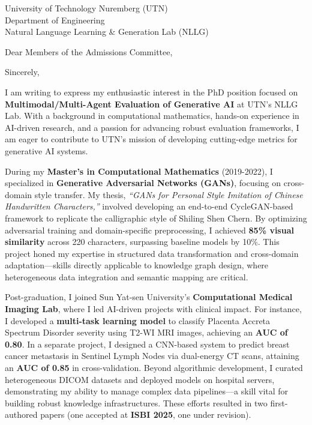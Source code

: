 \documentclass[11pt,a4paper, final]{moderncv}
\begin{document}
{University of Technology Nuremberg (UTN)\\
Department of Engineering\\
Natural Language Learning \& Generation Lab (NLLG)
}
\date{\today}
\opening{Dear Members of the Admissions Committee,}
\closing{Sincerely,}
\makelettertitle
\thispagestyle{empty}
\pagestyle{empty}
I am writing to express my enthusiastic interest in the PhD position focused on 
\textbf{Multimodal/Multi-Agent Evaluation of Generative AI} at UTN's NLLG Lab. 
With a background in computational mathematics, hands-on experience in AI-driven research, 
and a passion for advancing robust evaluation frameworks, 
I am eager to contribute to UTN's mission of developing cutting-edge metrics for generative AI systems.

During my \textbf{Master's in Computational Mathematics} (2019-2022), 
I specialized in \textbf{Generative Adversarial Networks (GANs)}, 
focusing on cross-domain style transfer. 
My thesis, \emph{``GANs for Personal Style Imitation of Chinese Handwritten Characters,''} 
involved developing an end-to-end CycleGAN-based framework to replicate the calligraphic style of Shiling Shen Chern. 
By optimizing adversarial training and domain-specific preprocessing, 
I achieved \textbf{85\% visual similarity} across 220 characters, surpassing baseline models by 10\%. 
This project honed my expertise in structured data transformation and cross-domain adaptation—skills directly applicable to knowledge graph design, where heterogeneous data integration and semantic mapping are critical.

Post-graduation, I joined Sun Yat-sen University's \textbf{Computational Medical Imaging Lab}, 
where I led AI-driven projects with clinical impact. 
For instance, I developed a \textbf{multi-task learning model} to 
classify Placenta Accreta Spectrum Disorder severity using T2-WI MRI images, achieving an \textbf{AUC of 0.80}. 
In a separate project, 
I designed a CNN-based system to predict breast cancer metastasis in Sentinel Lymph Nodes via dual-energy CT scans, 
attaining an \textbf{AUC of 0.85} in cross-validation. 
Beyond algorithmic development, I curated heterogeneous DICOM datasets and deployed models on hospital servers, 
demonstrating my ability to manage complex data pipelines—a skill vital for building robust knowledge infrastructures. 
These efforts resulted in two first-authored papers (one accepted at \textbf{ISBI 2025}, one under revision).
\end{document}
